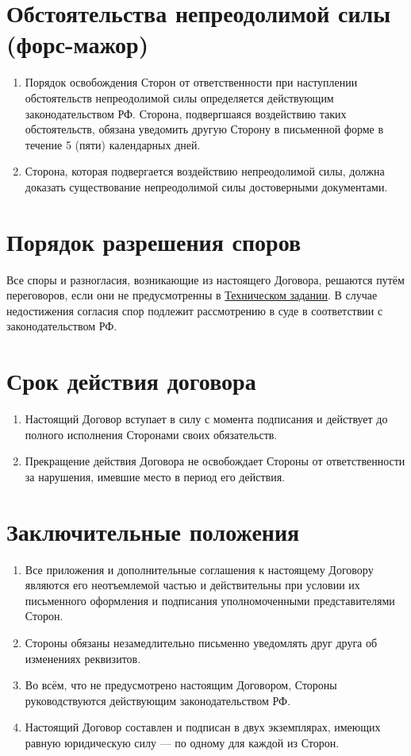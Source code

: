 \documentclass[12pt]{article}
\newcommand{\TZ}[1][Техническое задание]{\hyperref[link-tz]{#1}}
\begin{document}
\section{Обстоятельства непреодолимой силы (форс-мажор)}

\begin{enumerate}
    \item Порядок освобождения Сторон от ответственности при наступлении обстоятельств непреодолимой силы определяется действующим законодательством РФ. Сторона, подвергшаяся воздействию таких обстоятельств, обязана уведомить другую Сторону в письменной форме в течение 5 (пяти) календарных дней.
    \item Сторона, которая подвергается воздействию непреодолимой силы, должна доказать существование непреодолимой силы достоверными документами.
\end{enumerate}

\section{Порядок разрешения споров}

Все споры и разногласия, возникающие из настоящего Договора, решаются путём переговоров, если они не предусмотренны в \TZ[Техническом задании]. В случае недостижения согласия спор подлежит рассмотрению в суде в соответствии с законодательством РФ.

\section{Срок действия договора}

\begin{enumerate}
    \item Настоящий Договор вступает в силу с момента подписания и действует до полного исполнения Сторонами своих обязательств.
    \item Прекращение действия Договора не освобождает Стороны от ответственности за нарушения, имевшие место в период его действия.
\end{enumerate}

\section{Заключительные положения}

\begin{enumerate}
    \item Все приложения и дополнительные соглашения к настоящему Договору являются его неотъемлемой частью и действительны при условии их письменного оформления и подписания уполномоченными представителями Сторон.
    \item Стороны обязаны незамедлительно письменно уведомлять друг друга об изменениях реквизитов.
    \item Во всём, что не предусмотрено настоящим Договором, Стороны руководствуются действующим законодательством РФ.
    \item Настоящий Договор составлен и подписан в двух экземплярах, имеющих равную юридическую силу — по одному для каждой из Сторон.
\end{enumerate}
\end{document}
